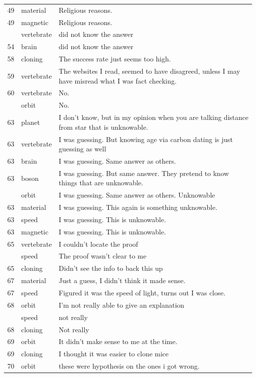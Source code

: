 \documentclass[
  doc,floatsintext]{apa6}
\begin{document}
\begin{longtable}[t]{>{}r>{}l>{\raggedright\arraybackslash}p{30em}}
49 & material & Religious reasons.\\
49 & magnetic & Religious reasons.\\
\addlinespace
54 & vertebrate & did not know the answer\\
54 & brain & did not know the answer\\
58 & cloning & The success rate just seems too high.\\
59 & vertebrate & The websites I read, seemed to have disagreed, unless I may have misread what I was fact checking.\\
60 & vertebrate & No.\\
\addlinespace
60 & orbit & No.\\
63 & planet & I don't know, but in my opinion when you are talking distance from star that is unknowable.\\
63 & vertebrate & I was guessing.  But knowing age via carbon dating is just guessing as well\\
63 & brain & I was guessing.  Same answer as others.\\
63 & boson & I was guessing.  But same answer.  They pretend to know things that are unknowable.\\
\addlinespace
63 & orbit & I was guessing.  Same answer as others.  Unknowable\\
63 & material & I was guessing.  This again is something unknowable.\\
63 & speed & I was guessing.  This is unknowable.\\
63 & magnetic & I was guessing.  This is unknowable.\\
65 & vertebrate & I couldn’t locate the proof\\
\addlinespace
65 & speed & The proof wasn’t clear to me\\
65 & cloning & Didn’t see the info to back this up\\
67 & material & Just a guess, I didn't think it made sense.\\
67 & speed & Figured it was the speed of light, turns out I was close.\\
68 & orbit & I'm not really able to give an explanation\\
\addlinespace
68 & speed & not really\\
68 & cloning & Not really\\
69 & orbit & It didn't make sense to me at the time.\\
69 & cloning & I thought it was easier to clone mice\\
70 & orbit & these were hypothesis on the ones i got wrong.\\

\end{longtable}
\end{document}
